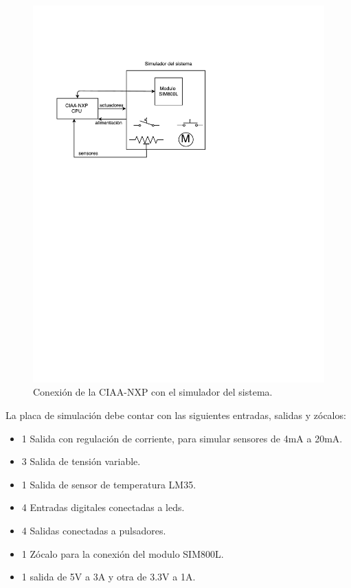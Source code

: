 \begin{figure}[!htb]
  \centering
  \includegraphics[page=1,scale=1,clip,trim=1.5cm 16.5cm 5.5cm 3.5cm]{./Figures/ciaa_placa_base.pdf}
  \caption{Conexión de la CIAA-NXP con el simulador del sistema.}
  \label{fig:diagrama_simulado}
\end{figure}


La placa de simulación debe contar con las siguientes entradas, salidas y zócalos:

\begin{itemize}
  \item 1 Salida con regulación de corriente, para simular sensores de 4mA a 20mA.
  \item 3 Salida de tensión variable.
  \item 1 Salida de sensor de temperatura LM35.
  \item 4 Entradas digitales conectadas a leds.
  \item 4 Salidas conectadas a pulsadores. 
  \item 1 Zócalo para la conexión del modulo SIM800L. 
  \item 1 salida de 5V a 3A y otra de 3.3V a 1A. 
\end{itemize}

